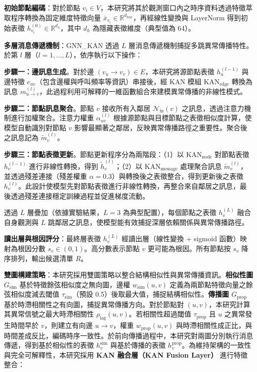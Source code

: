 \documentclass[10pt,a4paper,twocolumn]{article}
\begin{document}
\textbf{初始節點編碼}：對於節點 $v_i \in V$，本研究將其於觀測窗口內之時序資料透過特徵萃取程序轉換為固定維度特徵向量 $\bar{x}_{v_i} \in \mathbb{R}^{d_{\text{feat}}}$，再經線性變換與 LayerNorm 得到初始表徵 $h_{v_i}^{(0)} \in \mathbb{R}^{d_h}$，其中 $d_h$ 為隱藏表徵維度（典型值為 64）。

\textbf{多層消息傳遞機制}：GNN\_KAN 透過 $L$ 層消息傳遞機制捕捉多跳異常傳播特性。於第 $l$ 層（$l = 1, ..., L$），依序執行以下操作：

\textbf{步驟一：邊訊息生成}。對於邊 $(v_u \to v_v) \in E$，本研究將源節點表徵 $h_u^{(l-1)}$ 與邊特徵 $e_{uv}$（包含邊權與呼叫頻率等資訊）串接後，經 KAN 模組 $\text{KAN}_{\text{edge}}$ 轉換為訊息 $m_{u \to v}^{(l)}$，此過程利用可解釋的一維函數組合來建模異常傳播的非線性模式。

\textbf{步驟二：節點訊息聚合}。節點 $v$ 接收所有入鄰居 $\mathcal{N}_{\text{in}}(v)$ 之訊息，透過注意力機制進行加權聚合。注意力權重 $\alpha_{uv}^{(l)}$ 根據源節點與目標節點之表徵相似度計算，使模型自動識別對節點 $v$ 影響最顯著之鄰居，反映異常傳播路徑之重要性。聚合後之訊息記為 $\tilde{m}_v^{(l)}$。

\textbf{步驟三：節點表徵更新}。節點更新程序分為兩階段：（1）以 $\text{KAN}_{\text{node}}$ 對節點表徵 $h_v^{(l-1)}$ 進行非線性轉換，得到 $\tilde{h}_v^{(l)}$；（2）以 $\text{KAN}_{\text{message}}$ 處理聚合訊息 $\tilde{m}_v^{(l)}$，並透過殘差連接（殘差權重 $\alpha=0.3$）與轉換後之表徵整合，得到更新後之表徵 $h_v^{(l)}$。此設計使模型先對節點表徵進行非線性轉換，再整合來自鄰居之訊息，最後透過殘差連接穩定訓練過程並促進梯度流動。

透過 $L$ 層疊加（依據實驗結果，$L=3$ 為典型配置），每個節點之表徵 $h_v^{(L)}$ 融合自身觀測與 $L$ 跳鄰居之訊息，使模型能有效捕捉深層依賴關係與異常傳播路徑。

\textbf{讀出層與根因評分}：最終層表徵 $h_v^{(L)}$ 經讀出層（線性變換 + sigmoid 函數）映射為根因分數 $s_v \in (0, 1)$。高分數表示節點 $v$ 更可能為根因。所有節點按 $s_v$ 降序排列，輸出候選清單 $R$。

\textbf{雙圖構建策略}：本研究採用雙圖策略以整合結構相似性與異常傳播資訊。\textbf{相似性圖 $G_{\text{sim}}$} 基於特徵餘弦相似度之無向圖，邊權 $w_{\text{sim}}(u, v)$ 定義為兩節點特徵向量之餘弦相似度減去閾值 $\tau_{\text{sim}}$（預設 0.5）後取最大值，捕捉結構相似性。\textbf{傳播圖 $G_{\text{prop}}$} 基於時滯相關性之有向圖，捕捉異常傳播方向。對於節點對 $(u, v)$，本研究計算其異常信號之最大時滯相關性 $\rho_{\text{lag}}(u, v)$。若相關性超過閾值 $\tau_{\text{prop}}$ 且 $u$ 之異常發生時間早於 $v$，則建立有向邊 $u \to v$，權重 $w_{\text{prop}}(u, v)$ 與時滯相關性成正比，與時間差成反比，編碼時序一致性。於前向傳播過程中，本研究對兩圖分別執行消息傳遞，得到基於相似性的表徵 $h_v^{\text{sim}}$ 與基於傳播的表徵 $h_v^{\text{prop}}$。為維持架構的一致性與完全可解釋性，本研究採用 \textbf{KAN 融合層（KAN Fusion Layer）} 進行特徵整合：
\end{document}

